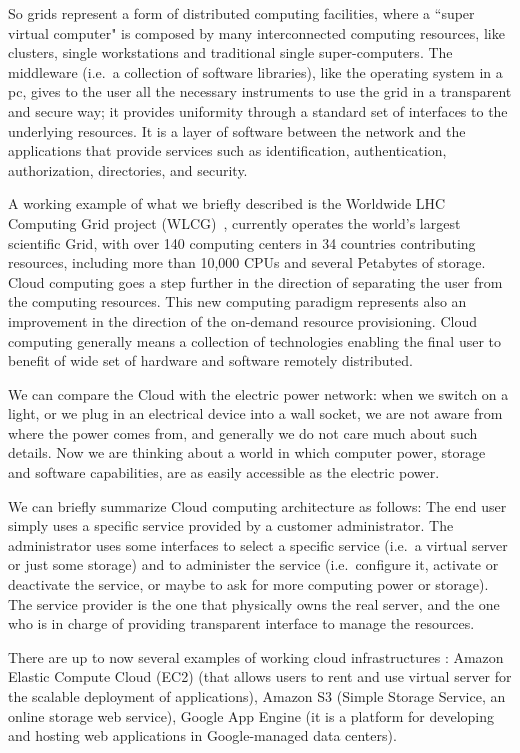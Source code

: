 So grids represent a form of distributed computing facilities, where a 
``super virtual computer" is composed by many interconnected computing resources,
like clusters, single workstations and traditional single super-computers.
The middleware (i.e.\ a collection of software libraries), like the 
operating system in a pc, gives to the user all
the necessary instruments to use the grid in a transparent and secure
way; it provides uniformity through a standard set of interfaces to the
underlying resources. It is a layer of software between the network and
the applications that provide services such as identification,
authentication, authorization, directories, and security. 

A working example of what we briefly described is the Worldwide LHC 
Computing Grid project (WLCG)~\cite{lcgwebsite},
currently operates the world's largest scientific Grid, with over 
140 computing centers in 34 countries contributing
resources, including more than 10,000 CPUs and several Petabytes of storage. 
Cloud computing goes a step further in the direction of separating the 
user from the computing resources. This new computing paradigm represents 
also an improvement in the direction of the on-demand resource provisioning. 
Cloud computing generally means a collection of technologies 
enabling the final user to benefit of wide set of hardware and 
software remotely distributed.

We can compare the Cloud with the electric power
network: when we switch on a light, or we plug in an
electrical device into a wall socket, we are not aware from where the
power comes from, and generally we do not care much about such details.
Now we are thinking about a world in which computer power, storage 
and software capabilities, are as easily accessible as the electric power. 

We can briefly summarize Cloud computing architecture as follows: 
The end user simply uses a specific service provided by a customer administrator.
The administrator uses some interfaces to select a specific service 
(i.e.\ a virtual server or just some storage) and to administer the 
service (i.e.\ configure it, activate or deactivate 
the service, or maybe to ask for more computing power or storage). 
The service provider is the one that physically owns the real server, and 
the one who is in charge of providing transparent interface to manage 
the resources.

There are up to now several examples of working cloud infrastructures : 
Amazon Elastic Compute Cloud (EC2) (that allows users to rent and use 
virtual server for the scalable deployment of applications), Amazon S3 
(Simple Storage Service, an online storage web service), Google App Engine 
(it is a platform for developing and hosting web applications
in Google-managed data centers).

